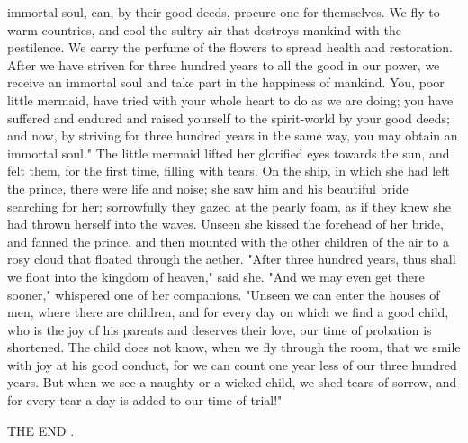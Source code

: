 immortal soul, can, by their good deeds, procure one for themselves.
We fly to warm countries, and cool the sultry air that destroys
mankind with the pestilence. We carry the perfume of the flowers to
spread health and restoration. After we have striven for three hundred
years to all the good in our power, we receive an immortal soul and
take part in the happiness of mankind. You, poor little mermaid,
have tried with your whole heart to do as we are doing; you have
suffered and endured and raised yourself to the spirit-world by your
good deeds; and now, by striving for three hundred years in the same
way, you may obtain an immortal soul."
    The little mermaid lifted her glorified eyes towards the sun,
and felt them, for the first time, filling with tears. On the ship, in
which she had left the prince, there were life and noise; she saw
him and his beautiful bride searching for her; sorrowfully they
gazed at the pearly foam, as if they knew she had thrown herself
into the waves. Unseen she kissed the forehead of her bride, and
fanned the prince, and then mounted with the other children of the air
to a rosy cloud that floated through the aether.
    "After three hundred years, thus shall we float into the kingdom
of heaven," said she. "And we may even get there sooner," whispered
one of her companions. "Unseen we can enter the houses of men, where
there are children, and for every day on which we find a good child,
who is the joy of his parents and deserves their love, our time of
probation is shortened. The child does not know, when we fly through
the room, that we smile with joy at his good conduct, for we can count
one year less of our three hundred years. But when we see a naughty or
a wicked child, we shed tears of sorrow, and for every tear a day is
added to our time of trial!"


                            THE END
.
